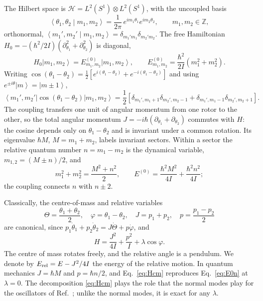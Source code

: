 \documentclass[aps,preprint,12pt,superscriptaddress,nofootinbib]{revtex4-2}
\newcommand{\ket}[1]{\left|#1\right\rangle}
\newcommand{\bra}[1]{\left\langle#1\right|}
\newcommand{\braket}[2]{\left\langle#1\middle|#2\right\rangle}
\newcommand{\Erel}{E_{\rm rel}}
\begin{document}
The Hilbert space is $\mathcal{H}=L^{2}(S^{1})\otimes L^{2}(S^{1})$, with the
uncoupled basis
\begin{equation}
\braket{\theta_{1},\theta_{2}}{m_{1},m_{2}}=\frac{1}{2\pi}\,e^{im_{1}\theta_{1}}
e^{im_{2}\theta_{2}},\qquad m_{1},m_{2}\in\mathbb{Z},
\label{eq:basis}
\end{equation}
orthonormal, $\braket{m_{1}',m_{2}'}{m_{1},m_{2}}=\delta_{m_{1}'m_{1}}\delta_{m_{2}'m_{2}}$.
The free Hamiltonian
$H_{0}=-(\hbar^{2}/2I)(\partial_{\theta_{1}}^{2}+\partial_{\theta_{2}}^{2})$ is
diagonal,
\begin{equation}
H_{0}\ket{m_{1},m_{2}}=E^{(0)}_{m_{1},m_{2}}\ket{m_{1},m_{2}},\qquad
E^{(0)}_{m_{1},m_{2}}=\frac{\hbar^{2}}{2I}\left(m_{1}^{2}+m_{2}^{2}\right).
\label{eq:E0}
\end{equation}
Writing $\cos(\theta_{1}-\theta_{2})=\frac12[e^{i(\theta_{1}-\theta_{2})}
+e^{-i(\theta_{1}-\theta_{2})}]$ and using $e^{\pm i\theta}\ket m=\ket{m\pm1}$,
\begin{equation}
\bra{m_{1}',m_{2}'}\cos(\theta_{1}-\theta_{2})\ket{m_{1},m_{2}}
=\frac12\left[\delta_{m_{1}',m_{1}+1}\delta_{m_{2}',m_{2}-1}
+\delta_{m_{1}',m_{1}-1}\delta_{m_{2}',m_{2}+1}\right].
\label{eq:V}
\end{equation}
The coupling transfers one unit of angular momentum from one rotor to the other, so
the total angular momentum $J=-i\hbar(\partial_{\theta_{1}}+\partial_{\theta_{2}})$
commutes with $H$: the cosine depends only on $\theta_{1}-\theta_{2}$ and is invariant
under a common rotation. Its eigenvalue $\hbar M$, $M=m_{1}+m_{2}$, labels invariant
sectors. Within a sector the relative quantum number $n=m_{1}-m_{2}$ is the
dynamical variable, $m_{1,2}=(M\pm n)/2$, and
\begin{equation}
m_{1}^{2}+m_{2}^{2}=\frac{M^{2}+n^{2}}{2},\qquad
E^{(0)}=\frac{\hbar^{2}M^{2}}{4I}+\frac{\hbar^{2}n^{2}}{4I};
\label{eq:E0n}
\end{equation}
the coupling connects $n$ with $n\pm2$.

Classically, the centre-of-mass and relative variables
\begin{equation}
\Theta=\frac{\theta_{1}+\theta_{2}}{2},\quad\varphi=\theta_{1}-\theta_{2},\quad
J=p_{1}+p_{2},\quad p=\frac{p_{1}-p_{2}}{2}
\label{eq:cmrel}
\end{equation}
are canonical, since $p_{1}\dot\theta_{1}+p_{2}\dot\theta_{2}=J\dot\Theta+p\dot\varphi$,
and
\begin{equation}
H=\frac{J^{2}}{4I}+\frac{p^{2}}{I}+\lambda\cos\varphi .
\label{eq:Hcm}
\end{equation}
The centre of mass rotates freely, and the relative angle is a pendulum. We denote by
$\Erel=E-J^{2}/4I$ the energy of the relative motion. In quantum mechanics $J=\hbar M$
and $p=\hbar n/2$, and Eq.~\eqref{eq:Hcm} reproduces Eq.~\eqref{eq:E0n} at
$\lambda=0$. The decomposition \eqref{eq:Hcm} plays the role that the normal modes
play for the oscillators of Ref.~\cite{DKS}; unlike the normal modes, it is exact
for any $\lambda$.
\end{document}
